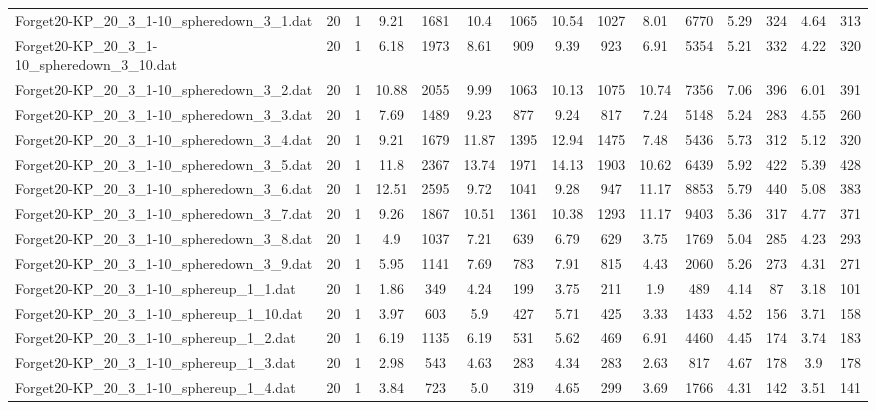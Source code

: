 \begin{table}[!ht]
{\begin{tabular}{lcccccccccccccc}
Forget20-KP\_20\_3\_1-10\_spheredown\_3\_1.dat & 20 & 1 & 9.21 & 1681 & 10.4 & 1065 & 10.54 & 1027 & 8.01 & 6770 & 5.29 & 324 & 4.64 & 313 \\
Forget20-KP\_20\_3\_1-10\_spheredown\_3\_10.dat & 20 & 1 & 6.18 & 1973 & 8.61 & 909 & 9.39 & 923 & 6.91 & 5354 & 5.21 & 332 & 4.22 & 320 \\
Forget20-KP\_20\_3\_1-10\_spheredown\_3\_2.dat & 20 & 1 & 10.88 & 2055 & 9.99 & 1063 & 10.13 & 1075 & 10.74 & 7356 & 7.06 & 396 & 6.01 & 391 \\
Forget20-KP\_20\_3\_1-10\_spheredown\_3\_3.dat & 20 & 1 & 7.69 & 1489 & 9.23 & 877 & 9.24 & 817 & 7.24 & 5148 & 5.24 & 283 & 4.55 & 260 \\
Forget20-KP\_20\_3\_1-10\_spheredown\_3\_4.dat & 20 & 1 & 9.21 & 1679 & 11.87 & 1395 & 12.94 & 1475 & 7.48 & 5436 & 5.73 & 312 & 5.12 & 320 \\
Forget20-KP\_20\_3\_1-10\_spheredown\_3\_5.dat & 20 & 1 & 11.8 & 2367 & 13.74 & 1971 & 14.13 & 1903 & 10.62 & 6439 & 5.92 & 422 & 5.39 & 428 \\
Forget20-KP\_20\_3\_1-10\_spheredown\_3\_6.dat & 20 & 1 & 12.51 & 2595 & 9.72 & 1041 & 9.28 & 947 & 11.17 & 8853 & 5.79 & 440 & 5.08 & 383 \\
Forget20-KP\_20\_3\_1-10\_spheredown\_3\_7.dat & 20 & 1 & 9.26 & 1867 & 10.51 & 1361 & 10.38 & 1293 & 11.17 & 9403 & 5.36 & 317 & 4.77 & 371 \\
Forget20-KP\_20\_3\_1-10\_spheredown\_3\_8.dat & 20 & 1 & 4.9 & 1037 & 7.21 & 639 & 6.79 & 629 & 3.75 & 1769 & 5.04 & 285 & 4.23 & 293 \\
Forget20-KP\_20\_3\_1-10\_spheredown\_3\_9.dat & 20 & 1 & 5.95 & 1141 & 7.69 & 783 & 7.91 & 815 & 4.43 & 2060 & 5.26 & 273 & 4.31 & 271 \\
Forget20-KP\_20\_3\_1-10\_sphereup\_1\_1.dat & 20 & 1 & 1.86 & 349 & 4.24 & 199 & 3.75 & 211 & 1.9 & 489 & 4.14 & 87 & 3.18 & 101 \\
Forget20-KP\_20\_3\_1-10\_sphereup\_1\_10.dat & 20 & 1 & 3.97 & 603 & 5.9 & 427 & 5.71 & 425 & 3.33 & 1433 & 4.52 & 156 & 3.71 & 158 \\
Forget20-KP\_20\_3\_1-10\_sphereup\_1\_2.dat & 20 & 1 & 6.19 & 1135 & 6.19 & 531 & 5.62 & 469 & 6.91 & 4460 & 4.45 & 174 & 3.74 & 183 \\
Forget20-KP\_20\_3\_1-10\_sphereup\_1\_3.dat & 20 & 1 & 2.98 & 543 & 4.63 & 283 & 4.34 & 283 & 2.63 & 817 & 4.67 & 178 & 3.9 & 178 \\
Forget20-KP\_20\_3\_1-10\_sphereup\_1\_4.dat & 20 & 1 & 3.84 & 723 & 5.0 & 319 & 4.65 & 299 & 3.69 & 1766 & 4.31 & 142 & 3.51 & 141 \\

\end{tabular}}
\end{table}
